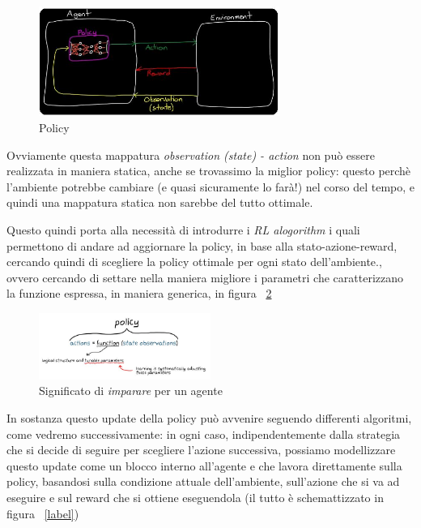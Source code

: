 \begin{figure}[!h]
	\centering
	\includegraphics[width=0.7\textwidth]{Immagini/Policy.JPG}
	\caption{Policy}
	\label{fig:Policy}
\end{figure}

Ovviamente questa mappatura \textit{observation (state) - action} non può essere realizzata in maniera statica, anche se trovassimo la miglior policy: questo perchè l'ambiente potrebbe cambiare (e quasi sicuramente lo farà!) nel corso del tempo, e quindi una mappatura statica non sarebbe del tutto ottimale.

Questo quindi porta alla necessità di introdurre i \textit{RL alogorithm} i quali permettono di andare ad aggiornare la policy, in base alla stato-azione-reward, cercando quindi di scegliere la policy ottimale per ogni stato dell'ambiente., ovvero cercando di settare nella maniera migliore i parametri che caratterizzano la funzione espressa, in maniera generica, in figura ~\ref{fig:PolicyFunction}

\begin{figure}[!h]
	\centering
	\includegraphics[width=0.5\textwidth]{Immagini/PolicyLearning.JPG}
	\caption{Significato di \textit{imparare} per un agente}
	\label{fig:PolicyFunction}
\end{figure}

\newpage

In sostanza questo update della policy può avvenire seguendo differenti algoritmi, come vedremo successivamente: in ogni caso, indipendentemente dalla strategia che si decide di seguire per scegliere l'azione successiva, possiamo modellizzare questo update come un blocco interno all'agente e che lavora direttamente sulla policy, basandosi sulla condizione attuale dell'ambiente, sull'azione che si va ad eseguire e sul reward che si ottiene eseguendola (il tutto è schemattizzato in figura ~\ref{label})

